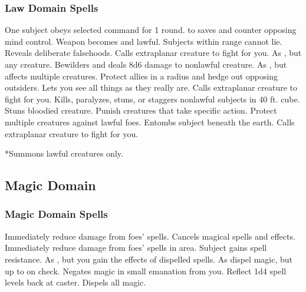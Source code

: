 \subsubsection{Law Domain Spells}
\begin{spelllist}
   One subject obeys selected command for 1 round.
    to saves and counter opposing mind control.
   Weapon becomes  and lawful.
   Subjects within range cannot lie.
   Reveals deliberate falsehoods.
   Calls extraplanar creature to fight for you.
   As , but any creature.
   Bewilders and deals 8d6 damage to nonlawful creature.
   As , but affects multiple creatures.
   Protect allies in a \areamed radius and hedge out opposing outsiders.
  \M Lets you see all things as they really are.
   Calls extraplanar creature to fight for you.
   Kills, paralyzes, stuns, or staggers nonlawful subjects in 40 ft. cube.
   Stuns bloodied creature.
   Punish creatures that take specific action.
  \F Protect multiple creatures against lawful foes.
   Entombs subject beneath the earth.
   Calls extraplanar creature to fight for you.
\end{spelllist}
*Summons lawful creatures only.

\subsection{Magic Domain}

\subsubsection{Magic Domain Spells}
\begin{spelllist}
   Immediately reduce damage from foes' spells.
  \spellhead[1]{}
  \spellhead[2]{}
  \spellhead[2]{}
   Cancels magical spells and effects.
   Immediately reduce damage from foes' spells in area.
  \spellhead[4]{}
   Subject gains spell resistance.
  \spellhead[5]{}
   As , but you gain the effects of dispelled spells.
  \spellhead[6]{}
   As dispel magic, but up to  on check.
   Negates magic in small emanation from you.
   Reflect 1d4 spell levels back at caster.
  \spellhead[8]{}
  \spellhead[8]{}
   Dispels all magic.
  \spellhead[9]{}
\end{spelllist}
